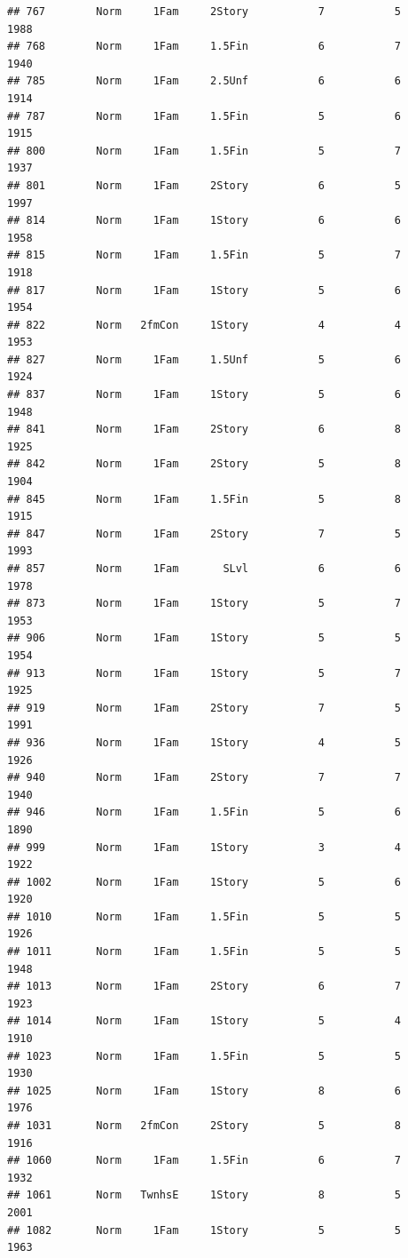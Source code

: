 \documentclass[]{article}
\begin{document}
\begin{verbatim}
## 767        Norm     1Fam     2Story           7           5      1988
## 768        Norm     1Fam     1.5Fin           6           7      1940
## 785        Norm     1Fam     2.5Unf           6           6      1914
## 787        Norm     1Fam     1.5Fin           5           6      1915
## 800        Norm     1Fam     1.5Fin           5           7      1937
## 801        Norm     1Fam     2Story           6           5      1997
## 814        Norm     1Fam     1Story           6           6      1958
## 815        Norm     1Fam     1.5Fin           5           7      1918
## 817        Norm     1Fam     1Story           5           6      1954
## 822        Norm   2fmCon     1Story           4           4      1953
## 827        Norm     1Fam     1.5Unf           5           6      1924
## 837        Norm     1Fam     1Story           5           6      1948
## 841        Norm     1Fam     2Story           6           8      1925
## 842        Norm     1Fam     2Story           5           8      1904
## 845        Norm     1Fam     1.5Fin           5           8      1915
## 847        Norm     1Fam     2Story           7           5      1993
## 857        Norm     1Fam       SLvl           6           6      1978
## 873        Norm     1Fam     1Story           5           7      1953
## 906        Norm     1Fam     1Story           5           5      1954
## 913        Norm     1Fam     1Story           5           7      1925
## 919        Norm     1Fam     2Story           7           5      1991
## 936        Norm     1Fam     1Story           4           5      1926
## 940        Norm     1Fam     2Story           7           7      1940
## 946        Norm     1Fam     1.5Fin           5           6      1890
## 999        Norm     1Fam     1Story           3           4      1922
## 1002       Norm     1Fam     1Story           5           6      1920
## 1010       Norm     1Fam     1.5Fin           5           5      1926
## 1011       Norm     1Fam     1.5Fin           5           5      1948
## 1013       Norm     1Fam     2Story           6           7      1923
## 1014       Norm     1Fam     1Story           5           4      1910
## 1023       Norm     1Fam     1.5Fin           5           5      1930
## 1025       Norm     1Fam     1Story           8           6      1976
## 1031       Norm   2fmCon     2Story           5           8      1916
## 1060       Norm     1Fam     1.5Fin           6           7      1932
## 1061       Norm   TwnhsE     1Story           8           5      2001
## 1082       Norm     1Fam     1Story           5           5      1963

\end{verbatim}
\end{document}
